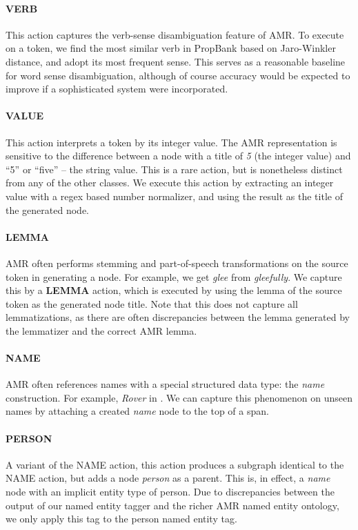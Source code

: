 \documentclass[11pt]{article}
\newcommand\w[1]{\textit{#1}} %
\newcommand\n[1]{\textit{#1}} %
\begin{document}
\paragraph{VERB} This action captures the verb-sense disambiguation feature of AMR. To execute on a token, we find the most similar verb in PropBank based on Jaro-Winkler distance, and adopt its most frequent sense.
This serves as a reasonable baseline for word sense disambiguation, although of
  course accuracy would be expected to improve if a sophisticated system were
  incorporated.

\paragraph{VALUE} This action interprets a token by its integer value. 
The AMR representation is sensitive to the difference between a node with a title
  of \n{5} (the integer value) and ``5'' or ``five'' -- the string value.
This is a rare action, but is nonetheless distinct from any of the other classes.
We execute this action by extracting an integer value with a regex based number normalizer, and using the result as the title of the generated node.

\paragraph{LEMMA} AMR often performs stemming and part-of-speech transformations on the source token in generating a node. 
For example, we get \n{glee} from \w{gleefully}.
We capture this by a \textbf{LEMMA} action, which is executed by using the lemma of the source token as the generated node title.
Note that this does not capture all lemmatizations, as there are often discrepancies
  between the lemma generated by the lemmatizer and the correct AMR lemma.

\paragraph{NAME} AMR often references names with a special structured data type: the \n{name} construction. 
For example, \w{Rover} in .
We can capture this phenomenon on unseen names by attaching a created \n{name} node to the top of a span.

\paragraph{PERSON} A variant of the NAME action, this action produces a subgraph identical to the NAME action, but adds a node \n{person} as a parent. This is, in effect, a \n{name} node with an implicit entity type of person. Due to discrepancies between the output of our named entity tagger and the richer AMR named entity ontology, we only apply this tag to the person named entity tag.
\end{document}
